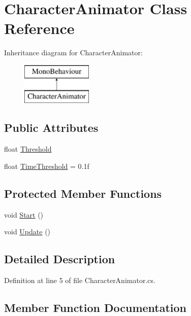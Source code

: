 \hypertarget{class_character_animator}{}\section{Character\+Animator Class Reference}
\label{class_character_animator}
Inheritance diagram for Character\+Animator\+:\begin{figure}[H]
\begin{center}
\leavevmode
\includegraphics[height=2.000000cm]{class_character_animator}
\end{center}
\end{figure}
\subsection*{Public Attributes}
\begin{DoxyCompactItemize}
\item 
float \mbox{\hyperlink{class_character_animator_a8a6338921429b3592f686a85bf4c180f}{Threshold}}
\item 
float \mbox{\hyperlink{class_character_animator_a814d1388371a3d17129e5be0014a98c7}{Time\+Threshold}} = 0.\+1f
\end{DoxyCompactItemize}
\subsection*{Protected Member Functions}
\begin{DoxyCompactItemize}
\item 
void \mbox{\hyperlink{class_character_animator_ac53582c38b509b8548095c9e1d201843}{Start}} ()
\item 
void \mbox{\hyperlink{class_character_animator_aa00597e81da1721e1f02fbd0e27368c0}{Update}} ()
\end{DoxyCompactItemize}


\subsection{Detailed Description}


Definition at line 5 of file Character\+Animator.\+cs.



\subsection{Member Function Documentation}
\mbox{\label{class_character_animator_ac53582c38b509b8548095c9e1d201843}} 
